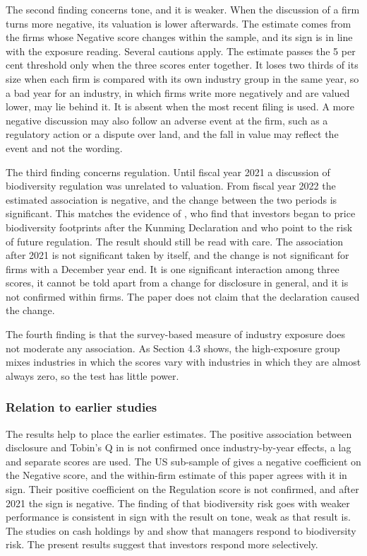 \documentclass[12pt,a4paper]{article}
\begin{document}
The second finding concerns tone, and it is weaker. When the discussion of a firm turns more negative, its valuation is lower afterwards. The estimate comes from the \nChangeNeg{} firms whose Negative score changes within the sample, and its sign is in line with the exposure reading. Several cautions apply. The estimate passes the 5 per cent threshold only when the three scores enter together. It loses two thirds of its size when each firm is compared with its own industry group in the same year, so a bad year for an industry, in which firms write more negatively and are valued lower, may lie behind it. It is absent when the most recent filing is used. A more negative discussion may also follow an adverse event at the firm, such as a regulatory action or a dispute over land, and the fall in value may reflect the event and not the wording.

The third finding concerns regulation. Until fiscal year 2021 a discussion of biodiversity regulation was unrelated to valuation. From fiscal year 2022 the estimated association is negative, and the change between the two periods is significant. This matches the evidence of \citet{garel2024}, who find that investors began to price biodiversity footprints after the Kunming Declaration and who point to the risk of future regulation. The result should still be read with care. The association after 2021 is not significant taken by itself, and the change is not significant for firms with a December year end. It is one significant interaction among three scores, it cannot be told apart from a change for disclosure in general, and it is not confirmed within firms. The paper does not claim that the declaration caused the change.

The fourth finding is that the survey-based measure of industry exposure does not moderate any association. As Section 4.3 shows, the high-exposure group mixes industries in which the scores vary with industries in which they are almost always zero, so the test has little power.

\subsubsection{Relation to earlier studies}

The results help to place the earlier estimates. The positive association between disclosure and Tobin's Q in \citet{he2024} is not confirmed once industry-by-year effects, a lag and separate scores are used. The US sub-sample of \citet{cosma2025} gives a negative coefficient on the Negative score, and the within-firm estimate of this paper agrees with it in sign. Their positive coefficient on the Regulation score is not confirmed, and after 2021 the sign is negative. The finding of \citet{bach2025} that biodiversity risk goes with weaker performance is consistent in sign with the result on tone, weak as that result is. The studies on cash holdings by \citet{ahmad2024} and \citet{wang2026} show that managers respond to biodiversity risk. The present results suggest that investors respond more selectively.
\end{document}
